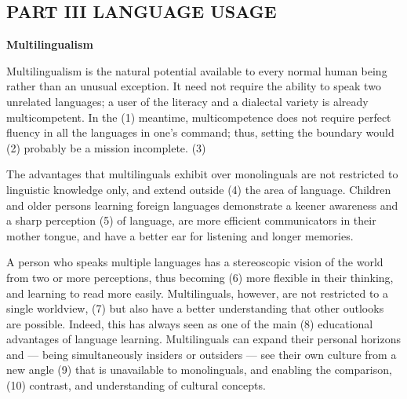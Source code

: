 \documentclass[UTF8,11pt]{ctexart}
\begin{document}
\subsection*{\textbf{PART III LANGUAGE USAGE}}


\textbf{Multilingualism}


Multilingualism is the natural potential available to every normal human being rather than an unusual exception. It need not require the ability to speak two unrelated languages; a user of the literacy and a dialectal variety is already multicompetent. In the (1) meantime, multicompetence does not require perfect fluency in all the languages in one’s command; thus, setting the boundary would (2) probably be a mission incomplete. (3)


The advantages that multilinguals exhibit over monolinguals are not restricted to linguistic knowledge only, and extend outside (4) the area of language. Children and older persons learning foreign languages demonstrate a keener awareness and a sharp perception (5) of language, are more efficient communicators in their mother tongue, and have a better ear for listening and longer memories.


A person who speaks multiple languages has a stereoscopic vision of the world from two or more perceptions, thus becoming (6) more flexible in their thinking, and learning to read more easily. Multilinguals, however, are not restricted to a single worldview, (7) but also have a better understanding that other outlooks are possible. Indeed, this has always seen as one of the main (8) educational advantages of language learning. Multilinguals can expand their personal horizons and — being simultaneously insiders or outsiders — see their own culture from a new angle (9) that is unavailable to monolinguals, and enabling the comparison, (10) contrast, and understanding of cultural concepts.
\end{document}
